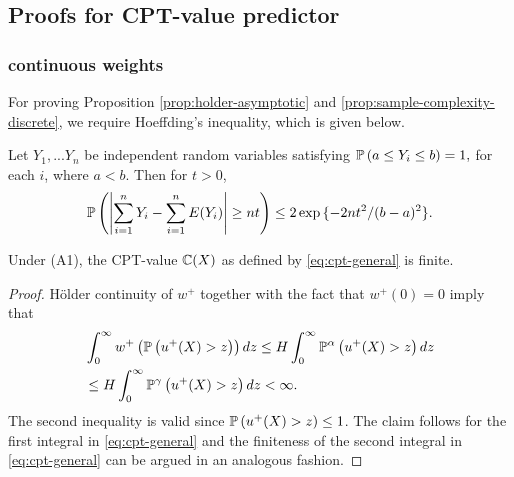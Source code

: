 \subsection{Proofs for CPT-value predictor}
\label{appendix:cpt-est}

\subsubsection{\holder continuous weights}
\label{sec:holder-proofs}
For proving Proposition \ref{prop:holder-asymptotic} and \ref{prop:sample-complexity-discrete}, we require Hoeffding's inequality, which is given below.
\begin{lemma}
Let $Y_1,...Y_n$ be independent random variables satisfying $\mathbb{P}\left( a\leq Y_i \leq b \right)= 1,$ for each $i$, where $a<b.
$ Then for $t>0$,
$$\mathbb{P}\left( \left|\sum_{i=1}^n Y_i -\sum_{i=1}^n E(Y_i)\right| \geq nt  \right) \leq 2\exp{\{-2nt^2 /(b-a)^2\}}. $$
\end{lemma}

\begin{proposition}
\label{prop:Holder-cpt-finite}
Under (A1), the CPT-value $\mathbb{C}(X)$ as defined by \eqref{eq:cpt-general} is finite. 
\end{proposition}
\begin{proof}

H\"{o}lder continuity of $w^+$ together with the fact that $w^+(0)=0$ imply that 
\begin{align*}
&\int_0^{\infty} w^+\left(\mathbb{P}\left( u^{+}(X)>z \right)\right) dz 
\le H \int_0^{\infty} \mathbb{P}^{\alpha} \left(u^+(X)>z\right) dz\\
&\le H \int_0^{\infty} \mathbb{P}^{\gamma} \left(u^+(X)>z\right) dz 
<\infty.
\end{align*}
The second inequality is valid since $\mathbb{P}\left( u^+(X)>z \right) \leq 1$. The claim follows for the first integral in \eqref{eq:cpt-general} and the finiteness of the second integral in \eqref{eq:cpt-general} can be argued in an analogous fashion.
\end{proof}


